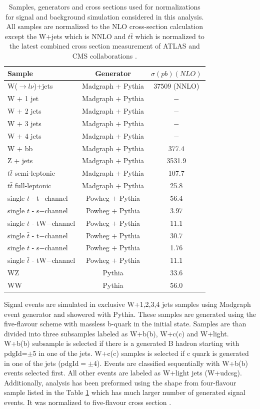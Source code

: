 \begin{table}[h]
  \centering
  \caption{Samples, generators and cross sections used for normalizations for signal and background simulation considered in this analysis. All samples are normalized to the NLO cross-section calculation except the W+jets which is NNLO and $t\bar{t}$ which is normalized to the latest combined cross section measurement of ATLAS and CMS collaborations \cite{CMS:2014gta}. }
  \label{tab:samples}
  \begin{tabular}{ l  c c}
      \hline
      \hline
      	Sample & Generator & $\sigma(pb)(NLO)$ \\
      	\hline
    		W($\rightarrow l \nu$)+jets &  Madgraph + Pythia & $37509$ (NNLO) \\
     	W $+$ 1 jet & Madgraph $+$ Pythia & $-$ \\
     	W $+$ 2 jets & Madgraph $+$ Pythia & $-$ \\
     	W $+$ 3 jets & Madgraph $+$ Pythia & $-$ \\
     	W $+$ 4 jets & Madgraph $+$ Pythia & $-$ \\
     	W $+$ bb & Madgraph $+$ Pythia & 377.4 \\
     	\hline
     	Z $+$ jets & Madgraph $+$ Pythia &  3531.9 \\     	
     	$t\bar{t}$ semi-leptonic & Madgraph $+$ Pythia &  107.7 \\
     	$t\bar{t}$ full-leptonic & Madgraph $+$ Pythia &  25.8 \\
     	\hline
     	single $t$ - t$-$channel & Powheg $+$ Pythia &  56.4 \\
     	single $t$ - s$-$channel & Powheg $+$ Pythia &  3.97 \\
		single $t$ - tW$-$channel & Powheg $+$ Pythia &  11.1 \\
		single $\bar{t}$ - t$-$channel & Powheg $+$ Pythia &  30.7 \\
		single $\bar{t}$ - s$-$channel & Powheg $+$ Pythia &  1.76 \\
		single $\bar{t}$ - tW$-$channel & Powheg $+$ Pythia &  11.1 \\
		\hline
		WZ & Pythia & 33.6 \\
		WW & Pythia & 56.0 \\
      \hline
      \hline 
  \end{tabular}
\end{table}

Signal events are simulated in exclusive W+1,2,3,4 jets samples using Madgraph event generator and showered with Pythia. These samples are generated using the five-flavour scheme with massless b-quark in the initial state. Samples are than divided into three subsamples labeled as W+b(b), W+c(c) and W+light. W+b(b) subsample is selected if there is a generated B hadron starting with pdgId=$\pm$5 in one of the jets. W+c(c) samples is selected if c quark is generated in one of the jets (pdgId$=\pm$4). Events are classified sequentially with W+b(b) events selected first. All other events are labeled as W+light jets (W+udcsg). Additionally, analysis has been preformed using the shape from four-flavour sample listed in the Table \ref{tab:samples} which has much larger number of generated signal events. It was normalized to five-flavour cross section .

